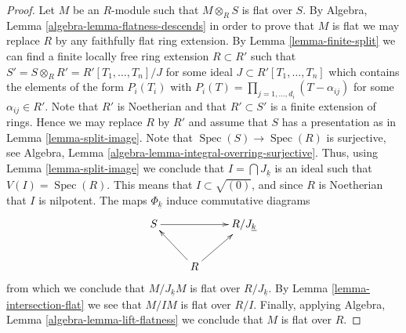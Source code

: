 \documentclass[10pt,a4paper]{amsart}
\theoremstyle{plain}
\theoremstyle{definition}
\theoremstyle{remark}
\numberwithin{equation}{subsection}
\def\Spec{\mathop{\mathrm{Spec}}}
\begin{document}
\begin{proof}
Let $M$ be an $R$-module such that $M \otimes_R S$ is flat over $S$. By
Algebra, Lemma \ref{algebra-lemma-flatness-descends}
in order to prove that $M$ is flat we may replace $R$ by any faithfully flat
ring extension. By
Lemma \ref{lemma-finite-split}
we can find a finite locally free ring extension $R \subset R'$ such
that $S' = S \otimes_R R' = R'[T_1, \ldots, T_n]/J$ for some ideal
$J \subset R'[T_1, \ldots, T_n]$ which contains the  elements of the form
$P_i(T_i)$ with $P_i(T) = \prod_{j = 1, \ldots, d_i} (T - \alpha_{ij})$
for some $\alpha_{ij} \in R'$. Note that $R'$ is Noetherian
and that $R' \subset S'$ is a finite extension of rings. Hence we may
replace $R$ by $R'$ and assume that $S$ has a presentation as in
Lemma \ref{lemma-split-image}.
Note that $\Spec(S) \to \Spec(R)$ is surjective, see
Algebra, Lemma \ref{algebra-lemma-integral-overring-surjective}.
Thus, using
Lemma \ref{lemma-split-image}
we conclude that $I = \bigcap J_{\underline{k}}$ is an ideal
such that $V(I) = \Spec(R)$. This means that
$I \subset \sqrt{(0)}$, and since $R$ is Noetherian that $I$
is nilpotent. The maps $\Phi_{\underline{k}}$ induce commutative
diagrams
$$
\xymatrix{
S \ar[rr] & & R/J_{\underline{k}} \\
& R \ar[lu] \ar[ru]
}
$$
from which we conclude that $M/J_{\underline{k}}M$ is flat over
$R/J_{\underline{k}}$. By
Lemma \ref{lemma-intersection-flat}
we see that $M/IM$ is flat over $R/I$. Finally, applying
Algebra, Lemma \ref{algebra-lemma-lift-flatness}
we conclude that $M$ is flat over $R$.
\end{proof}
\end{document}
